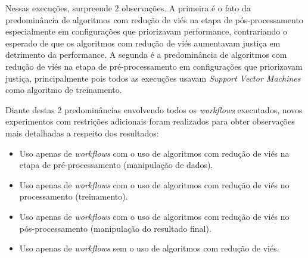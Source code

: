 \documentclass[portugues]{ic-tese}
\begin{document}
\begin{table}[H]
\begin{center}
  \caption{Melhores opções escolhidas pelo modelo MAPE-K \\ Todos os métodos - 25\% Performance/75\% Fairness}
\label{tbl:ScoreMAPEKGeral2575}
\end{center}
\end{table}

Nessas execuções, surpreende 2 observações. A primeira é o fato da predominância de algoritmos com redução de viés na etapa de pós-processamento especialmente em configurações que priorizavam performance, contrariando o esperado de que os algoritmos com redução de viés aumentavam justiça em detrimento da performance. A segunda é a predominância de algoritmos com redução de viés na etapa de pré-processamento em configurações que priorizavam justiça, principalmente pois todos as execuções usavam \textit{Support Vector Machines} como algoritmo de treinamento.

Diante destas 2 predominâncias envolvendo todos os \textit{workflows} executados, novos experimentos com restrições adicionais foram realizados para obter observações mais detalhadas a respeito dos resultados:

\begin{itemize}
\item Uso apenas de \textit{workflows} com o uso de algoritmos com redução de viés na etapa de \mbox{pré-processamento} (manipulação de dados).
\item Uso apenas de \textit{workflows} com o uso de algoritmos com redução de viés no \mbox{processamento} (treinamento).
\item Uso apenas de \textit{workflows} com o uso de algoritmos com redução de viés no \mbox{pós-processamento} (manipulação do resultado final).
\item Uso apenas de \textit{workflows} sem o uso de algoritmos com redução de viés.
\end{itemize}
\end{document}
